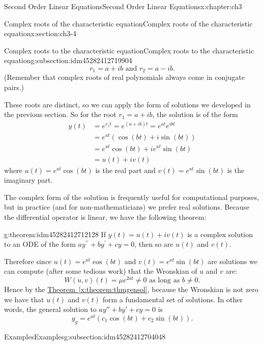 \documentclass[oneside,10pt,]{book}
\numberwithin{equation}{section}
\numberwithin{equation}{section}
\newcommand{\amp}{&}
\begin{document}
\begin{chapterptx}{Second Order Linear Equations}{}{Second Order Linear Equations}{}{}{x:chapter:ch3}
\begin{sectionptx}{Complex roots of the characteristic equation}{}{Complex roots of the characteristic equation}{}{}{x:section:ch3-4}
\begin{subsectionptx}{Complex roots to the characteristic equation}{}{Complex roots to the characteristic equation}{}{}{g:subsection:idm45282412719904}
\begin{equation*}
r_1=a + ib \text{ and }r_2=a - ib.
\end{equation*}
(Remember that complex roots of real polynomials always come in conjugate pairs.)%
\par
These roots are distinct, so we can apply the form of solutions we developed in the previous section. So for the root \(r_1 = a + ib\), the solution is of the form%
\begin{align*}
y(t) \amp =e^{r_1t}=e^{\left(a+ib \right)t}=e^{a t}e^{ib t}\\
\amp =e^{a t}\left(\cos\left(b t\right)+i\sin\left(b t\right)\right)\\
\amp =e^{a t}\cos\left(b t\right)+ie^{a t}\sin\left(b t\right)\\
\amp =u(t)+iv(t)
\end{align*}
where \(u(t)=e^{a t}\cos\left(b t\right)\) is the real part and \(v(t)=e^{a t}\sin\left(b t\right)\) is the imaginary part.%
\par
The complex form of the solution is frequently useful for computational purposes, but in practice (and for non-mathematicians) we prefer real solutions. Because the differential operator is linear, we have the following theorem:%
\begin{theorem}{}{}{g:theorem:idm45282412712128}%
If \(y(t)=u(t)+iv(t)\) is a complex solution to an ODE of the form \(ay^{\prime\prime}+by^{\prime}+cy=0\), then so are \(u(t)\) and \(v(t)\).%
\end{theorem}
Therefore since \(u(t)=e^{a t}\cos\left(b t\right)\) and \(v(t)=e^{a t}\sin\left(b t\right)\) are solutions we can compute (after some tedious work) that the Wronskian of \(u\) and \(v\) are:%
\begin{equation*}
W\left(u,v\right)(t)=\mu e^{2a t}\neq0\text{ as long as }b\neq0.
\end{equation*}
Hence by the \hyperref[x:theorem:thmgensol]{Theorem~\ref{x:theorem:thmgensol}}, because the Wronskian is not zero we have that \(u(t)\) and \(v(t)\) form a fundamental set of solutions. In other words, the general solution to \(a y '' + by' + cy = 0\) is%
\begin{equation*}
y_g = e^{at} (c_1 \cos(bt) + c_2\sin(bt)).
\end{equation*}
%
\end{subsectionptx}
%
%
\typeout{************************************************}
\typeout{************************************************}
%
\begin{subsectionptx}{Examples}{}{Examples}{}{}{g:subsection:idm45282412704048}

\end{subsectionptx}
\end{sectionptx}
\end{chapterptx}
\end{document}
